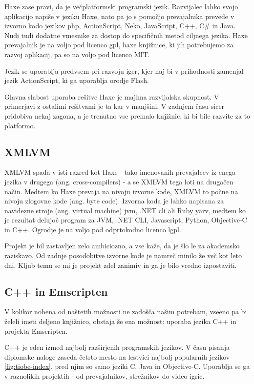 Haxe\cite{haxe} zase pravi, da je večplatformski programski jezik. Razvijalec lahko svojo aplikacijo napiše v jeziku Haxe, nato pa jo s pomočjo prevajalnika prevede v izvorno kodo jezikov \gls{php}, ActionScript, Neko, JavaScript, C++, C\# in Java. Nudi tudi dodatne vmesnike za dostop do specifičnih metod ciljnega jezika. Haxe prevajalnik je na voljo pod licenco \gls{gpl}, haxe knjižnice, ki jih potrebujemo za razvoj aplikacij, pa so na voljo pod licenco MIT.

Jezik se uporablja predvsem pri razvoju iger, kjer naj bi v prihodnosti zamenjal jezik ActionScript, ki ga uporablja orodje Flash.

Glavna slabost uporaba rešitve Haxe je majhna razvijalska skupnost. V primerjavi z ostalimi rešitvami je ta kar v manjšini. V zadnjem času sicer pridobiva nekaj zagona, a je trenutno vse premalo knjižnic, ki bi bile razvite za to platformo.

\subsection{XMLVM}

XMLVM\cite{xmlvm} spada v isti razred kot Haxe - tako imenovanih prevajalcev iz enega jezika v drugega (ang. cross-compilers) - a se XMLVM tega loti na drugačen način. Medtem ko Haxe prevaja na nivoju izvorne kode, XMLVM to počne na nivoju zlogovne kode (ang. byte code). Izvorna koda je lahko napisana za navidezne stroje (ang. virtual machine) \gls{jvm}, .NET \gls{cli} ali Ruby \gls{yarv}, medtem ko je rezultat delujoč program za JVM, .NET CLI, Javascript, Python, Objective-C in C++. Ogrodje je na voljo pod odprtokodno licenco \gls{lgpl}.

Projekt je bil zastavljen zelo ambiciozno, a vse kaže, da je šlo le za akademsko raziskavo. Od zadnje posodobitve izvorne kode je namreč minilo že več kot leto dni. Kljub temu se mi je projekt zdel zanimiv in ga je bilo vredno izpostaviti.

\subsection{C++ in Emscripten}

V kolikor nobena od naštetih možnosti ne zadošča našim potrebam, vseeno pa bi želeli imeti deljeno knjižnico, obstaja še ena možnost: uporaba jezika C++\cite{cpp} in projekta Emscripten\cite{emscripten}.

C++ je eden izmed najbolj razširjenih programskih jezikov. V času pisanja diplomske naloge zaseda četrto mesto na lestvici najbolj popularnih jezikov \ref{fig:tiobe-index}, pred njim so samo jeziki C, Java in Objective-C. Uporablja se ga v raznolikih projektih - od prevajalnikov, strežnikov do video igric.

